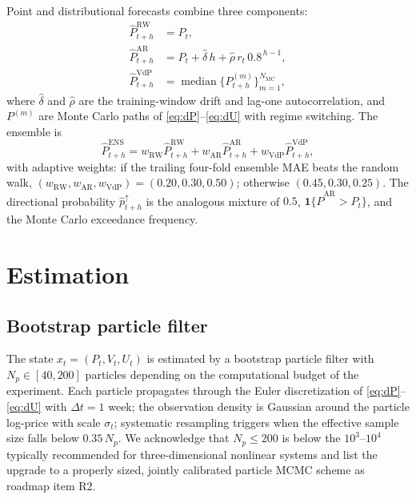 \documentclass[11pt,a4paper]{article}
\begin{document}
Point and distributional forecasts combine three components:
\begin{align}
\hat{P}^{\text{RW}}_{t+h} &= P_t,\\
\hat{P}^{\text{AR}}_{t+h} &= P_t + \hat{\delta}\,h + \hat{\rho}\, r_t \, 0.8^{\,h-1},\\
\hat{P}^{\text{VdP}}_{t+h} &= \operatorname{median}\big\{P^{(m)}_{t+h}\big\}_{m=1}^{N_{\mathrm{MC}}},
\end{align}
where $\hat\delta$ and $\hat\rho$ are the training-window drift and lag-one autocorrelation, and $P^{(m)}$ are Monte Carlo paths of \eqref{eq:dP}--\eqref{eq:dU} with regime switching. The ensemble is
\begin{equation}
\hat{P}^{\text{ENS}}_{t+h} = w_{\mathrm{RW}}\hat{P}^{\text{RW}}_{t+h}
+ w_{\mathrm{AR}}\hat{P}^{\text{AR}}_{t+h}
+ w_{\mathrm{VdP}}\hat{P}^{\text{VdP}}_{t+h},
\end{equation}
with adaptive weights: if the trailing four-fold ensemble MAE beats the random walk, $(w_{\mathrm{RW}},w_{\mathrm{AR}},w_{\mathrm{VdP}}) = (0.20,0.30,0.50)$; otherwise $(0.45,0.30,0.25)$. The directional probability $\hat{p}^{\uparrow}_{t+h}$ is the analogous mixture of $0.5$, $\mathbf{1}\{\hat{P}^{\text{AR}} > P_t\}$, and the Monte Carlo exceedance frequency.

\section{Estimation}\label{sec:estimation}

\subsection{Bootstrap particle filter}

The state $x_t = (P_t, V_t, U_t)$ is estimated by a bootstrap particle filter \citep{gordon1993novel} with $N_p \in [40, 200]$ particles depending on the computational budget of the experiment. Each particle propagates through the Euler discretization of \eqref{eq:dP}--\eqref{eq:dU} with $\Delta t = 1$ week; the observation density is Gaussian around the particle log-price with scale $\sigma_t$; systematic resampling triggers when the effective sample size falls below $0.35\,N_p$. We acknowledge that $N_p \le 200$ is below the $10^3$--$10^4$ typically recommended for three-dimensional nonlinear systems and list the upgrade to a properly sized, jointly calibrated particle MCMC scheme as roadmap item R2.
\end{document}

